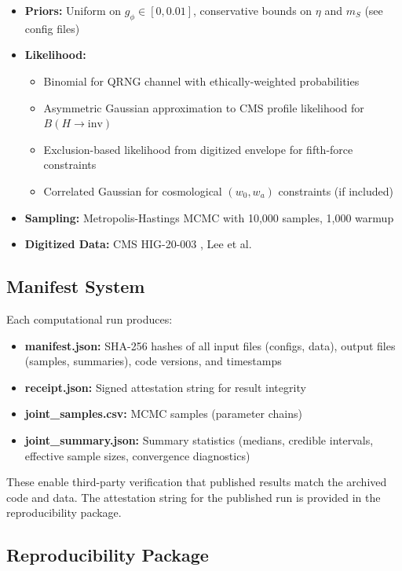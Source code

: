 \documentclass[11pt]{article}
\begin{document}
\begin{itemize}
    \item \textbf{Priors:} Uniform on $g_\phi \in [0, 0.01]$, conservative bounds on $\eta$ and $m_S$ (see config files)
    \item \textbf{Likelihood:} 
    \begin{itemize}
        \item Binomial for QRNG channel with ethically-weighted probabilities
        \item Asymmetric Gaussian approximation to CMS profile likelihood for $B(H\to\mathrm{inv})$
        \item Exclusion-based likelihood from digitized envelope for fifth-force constraints
        \item Correlated Gaussian for cosmological $(w_0, w_a)$ constraints (if included)
    \end{itemize}
    \item \textbf{Sampling:} Metropolis-Hastings MCMC with 10,000 samples, 1,000 warmup
    \item \textbf{Digitized Data:} CMS HIG-20-003 \cite{CMS_HIG20_003}, Lee et al. \cite{Lee2020ISL}
\end{itemize}

\subsection{Manifest System}

Each computational run produces:
\begin{itemize}
    \item \textbf{manifest.json:} SHA-256 hashes of all input files (configs, data), output files (samples, summaries), code versions, and timestamps
    \item \textbf{receipt.json:} Signed attestation string for result integrity
    \item \textbf{joint\_samples.csv:} MCMC samples (parameter chains)
    \item \textbf{joint\_summary.json:} Summary statistics (medians, credible intervals, effective sample sizes, convergence diagnostics)
\end{itemize}

These enable third-party verification that published results match the archived code and data. The attestation string for the published run is provided in the reproducibility package.

\subsection{Reproducibility Package}
\end{document}

